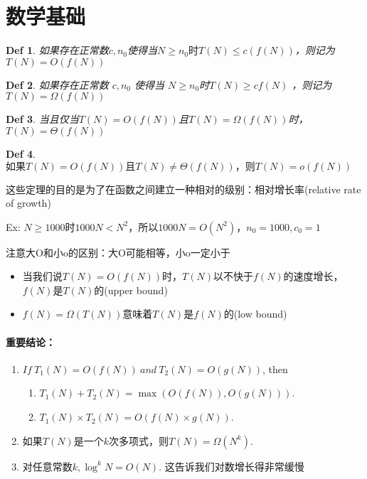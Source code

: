 \documentclass[utf8]{ctexbook}
\newtheorem{Definition}{\large\textbf Def}[chapter]
\begin{document}
\section{数学基础}
\begin{Definition}
    如果存在正常数$c,n_0$使得当$N\ge n_0时T(N) \le c(f(N))$，则记为$T(N) = O(f(N))$
\end{Definition}
\begin{Definition}
如果存在正常数 $c, n_0$ 使得当 $N\ge n_0$时$T(N) \ge cf(N)$ ，则记为 $T(N) = \Omega(f(N))$
\end{Definition}
\begin{Definition}
当且仅当$T(N) = O(f(N))$且$T(N) = \Omega (f(N))$时，$T(N) = \Theta(f(N))$
\end{Definition}
\begin{Definition}
$如果T(N) = O(f(N))且T(N) \ne \Theta (f(N))，则T(N) = o(f(N))$
\end{Definition}

这些定理的目的是为了在函数之间建立一种相对的级别：{\heiti 相对增长率}(relative rate of growth)

Ex: $N\ge 1000时1000 N < N^2，所以1000N = O(N^2)，n_0 = 1000, c_0 = 1$

注意大O和小o的区别：大O可能相等，小o一定小于

\begin{itemize}
    \item 当我们说$T(N) = O(f(N))$时，$T(N)$以不快于$f(N)$的速度增长，$f(N)$是$T(N)$的(upper bound)
    \item $f(N) = \Omega (T(N))$意味着$T(N)$是$f(N)$的(low bound)
\end{itemize}


\paragraph{重要结论：}
\begin{enumerate}
    \item $If\ T_1(N) = O(f(N))\ and\ T_2 (N) = O(g(N))$, then 
        \begin{enumerate}
            \item $T_1(N) + T_2(N) = \max (O(f(N)), O(g(N)))$.
            \item $T_1(N)\times T_2(N) = O(f(N)\times g(N))$.
        \end{enumerate}
    \item 如果$T(N)$是一个$k$次多项式，则$T(N) = \Omega (N^k)$.
    \item 对任意常数$k,\log ^kN = O(N)$. 这告诉我们对数增长得非常缓慢
\end{enumerate}
\end{document}
